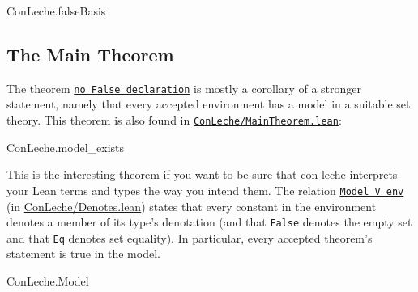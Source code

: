 \documentclass{article}
\newcommand\code[1]{\texttt{#1}}
\begin{document}
\begin{leanblock}[view=lean, sum=JXvtPVRWXF]{ConLeche.falseBasis}{}
\end{leanblock}

\subsection*{The Main Theorem}

The theorem \href{https://github.com/leanprover/con-leche/blob/master/ConLeche/MainTheorem.lean#L114-L121}{\code{no\_False\_declaration}} is mostly a corollary of a stronger statement, namely that every accepted environment has a model in a suitable set theory. This theorem is also found in \href{https://github.com/leanprover/con-leche/blob/master/ConLeche/MainTheorem.lean}{\code{ConLeche/MainTheorem.lean}}:

\begin{leanblock}[view=lean, sum=UuWemHidbh]{ConLeche.model_exists}{}
\end{leanblock}

This is the interesting theorem if you want to be sure that con-leche interprets your Lean terms and types the way you intend them. The relation \href{https://github.com/leanprover/con-leche/blob/master/ConLeche/Denotes.lean#L248-L268}{\code{Model V env}} (in \href{https://github.com/leanprover/con-leche/blob/master/ConLeche/Denotes.lean}{ConLeche/Denotes.lean}) states that every constant in the environment denotes a member of its type's denotation (and that \code{False} denotes the empty set and that \code{Eq} denotes set equality). In particular, every accepted theorem's statement is true in the model.

\begin{leanblock}[view=lean, sum=Ndz2kjaXmL]{ConLeche.Model}{}
\end{leanblock}
\end{document}
